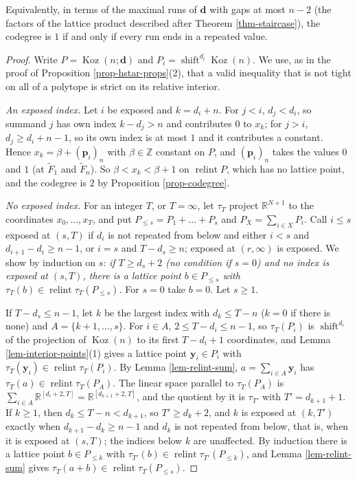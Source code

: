 \documentclass[11pt, a4paper, abstract=yes]{scrartcl}
\theoremstyle{definition}
\theoremstyle{remark}
\theoremstyle{plain}
\newcommand{\vek}[1]{\boldsymbol{#1}}
\theoremstyle{remark}
\theoremstyle{plain}
\newcommand{\Koz}{\operatorname{Koz}}
\newcommand{\shift}{\operatorname{shift}}
\newcommand{\relint}{\operatorname{relint}}
\begin{document}
Equivalently, in terms of the maximal runs of \(\vek d\) with gaps at most \(n-2\) (the factors of the
lattice product described after Theorem \ref{thm-staircase}), the codegree is \(1\) if and only if every
run ends in a repeated value.

\begin{proof}
Write \(P=\Koz(n;\vek d)\) and \(P_i=\shift^{d_i}\Koz(n)\). We use, as in the proof of Proposition
\ref{prop-hstar-props}(2), that a valid inequality that is not tight on all of a polytope is strict on its
relative interior.

\emph{An exposed index.} Let \(i\) be exposed and \(k=d_i+n\). For \(j<i\), \(d_j<d_i\), so summand \(j\) has
own index \(k-d_j>n\) and contributes \(0\) to \(x_k\); for \(j>i\), \(d_j\ge d_i+n-1\), so its own index
is at most \(1\) and it contributes a constant. Hence \(x_k=\beta+(\vek p_i)_n\) with \(\beta\in\mathbb Z\)
constant on \(P\), and \((\vek p_i)_n\) takes the values \(0\) and \(1\) (at \(\tilde F_1\) and
\(\tilde F_n\)). So \(\beta<x_k<\beta+1\) on \(\relint P\), which has no lattice point, and the codegree
is \(2\) by Proposition \ref{prop-codegree}.

\emph{No exposed index.} For an integer \(T\), or \(T=\infty\), let \(\tau_T\) project \(\mathbb R^{N+1}\) to the
coordinates \(x_0,\dots,x_T\), and put \(P_{\le s}=P_1+\dots+P_s\) and \(P_X=\sum_{i\in X}P_i\). Call
\(i\le s\) exposed at \((s,T)\) if \(d_i\) is not repeated from below and either \(i<s\) and
\(d_{i+1}-d_i\ge n-1\), or \(i=s\) and \(T-d_s\ge n\); exposed at \((r,\infty)\) is exposed. We show by
induction on \(s\): \emph{if \(T\ge d_s+2\) (no condition if \(s=0\)) and no index is exposed at \((s,T)\), there is a lattice point
\(b\in P_{\le s}\) with \(\tau_T(b)\in\relint\tau_T(P_{\le s})\).} For \(s=0\) take \(b=0\). Let \(s\ge1\).

If \(T-d_s\le n-1\), let \(k\) be the largest index with \(d_k\le T-n\) (\(k=0\) if there is none) and
\(A=\lbrace k+1,\dots,s\rbrace\). For \(i\in A\), \(2\le T-d_i\le n-1\), so \(\tau_T(P_i)\) is \(\shift^{d_i}\)
of the projection of \(\Koz(n)\) to its first \(T-d_i+1\) coordinates, and Lemma
\ref{lem-interior-points}(1) gives a lattice point \(\vek y_i\in P_i\) with
\(\tau_T(\vek y_i)\in\relint\tau_T(P_i)\). By Lemma \ref{lem-relint-sum}, \(a=\sum_{i\in A}\vek y_i\) has
\(\tau_T(a)\in\relint\tau_T(P_A)\). The linear space parallel to \(\tau_T(P_A)\) is
\(\sum_{i\in A}\mathbb R^{[d_i+2,T]}=\mathbb R^{[d_{k+1}+2,T]}\), and the quotient by it is \(\tau_{T'}\) with
\(T'=d_{k+1}+1\). If \(k\ge1\), then \(d_k\le T-n<d_{k+1}\), so \(T'\ge d_k+2\), and \(k\) is exposed at
\((k,T')\) exactly when \(d_{k+1}-d_k\ge n-1\) and \(d_k\) is not repeated from below, that is, when
it is exposed at \((s,T)\); the indices below \(k\) are unaffected. By induction there is a lattice
point \(b\in P_{\le k}\) with \(\tau_{T'}(b)\in\relint\tau_{T'}(P_{\le k})\), and Lemma
\ref{lem-relint-sum} gives \(\tau_T(a+b)\in\relint\tau_T(P_{\le s})\).


\end{proof}
\end{document}
